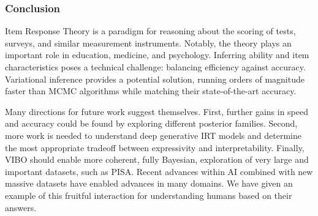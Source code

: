 \subsubsection{Conclusion}
Item Response Theory is a paradigm for reasoning about the scoring of tests, surveys, and similar measurement instruments.
Notably, the theory plays an important role in education, medicine, and psychology.
Inferring ability and item characteristics poses a technical challenge: balancing efficiency against accuracy.
Variational inference provides a potential solution, running orders of magnitude faster than MCMC algorithms while matching their state-of-the-art accuracy.

Many directions for future work suggest themselves.
First, further gains in speed and accuracy could be found by exploring different posterior families.
Second, more work is needed to understand deep generative IRT models and determine the most appropriate tradeoff between expressivity and interpretability.
Finally, VIBO should enable more coherent, fully Bayesian, exploration of very large and important datasets, such as PISA.
Recent advances within AI combined with new massive datasets have enabled advances in many domains.
We have given an example of this fruitful interaction for understanding humans based on their answers.